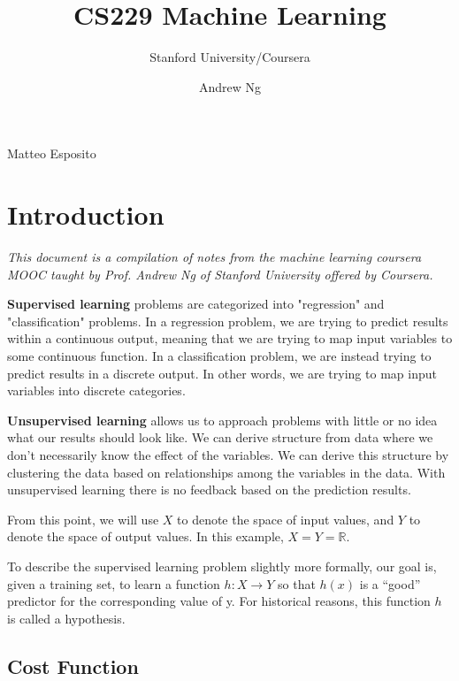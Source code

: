 \documentclass{article}
\title{CS229 Machine Learning}
\author{Stanford University/Coursera}
\date{Andrew Ng}
\begin{document}
    \begin{titlingpage}
        \maketitle
        \centering
        \vfill
        {\large{Matteo Esposito}}
    \end{titlingpage}

    \newpage

    \section{Introduction}

        \textit{This document is a compilation of notes from the machine learning coursera MOOC taught by Prof. Andrew Ng of Stanford University
        offered by Coursera.}
        \par
        \textbf{Supervised learning} problems are categorized into "regression" and "classification" problems. In a regression problem, 
        we are trying to predict results within a continuous output, meaning that we are trying to map input variables to some 
        continuous function. In a classification problem, we are instead trying to predict results in a discrete output. In other words, 
        we are trying to map input variables into discrete categories.
        \par
        \textbf{Unsupervised learning} allows us to approach problems with little or no idea what our results should look like. 
        We can derive structure from data where we don't necessarily know the effect of the variables.
        We can derive this structure by clustering the data based on relationships among the variables in the data.
        With unsupervised learning there is no feedback based on the prediction results.
        \par
        From this point, we will use $X$ to denote the space of input values, and $Y$ to denote the space of output values. In this example, $X = Y = \mathbb{R}$.
        \par
        To describe the supervised learning problem slightly more formally, our goal is, given a training set, 
        to learn a function $h : X \longrightarrow Y$ so that $h(x)$ is a “good” predictor for the corresponding value of y. For historical reasons, this 
        function $h$ is called a hypothesis. 
        
        \subsection{Cost Function}
            
\end{document}
